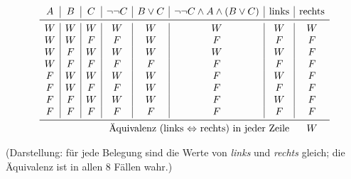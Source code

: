 \documentclass{article}
\begin{document}
\[
    \begin{array}{c|c|c|c|c|c|c|c}
        A                                                                                     & B & C & \neg\neg C & B\lor C & \neg\neg C\land A\land(B\lor C) & \text{links} & \text{rechts} \\
        \midrule
        W                                                                                     & W & W & W          & W       & W                               & W            & W             \\
        W                                                                                     & W & F & F          & W       & F                               & F            & F             \\
        W                                                                                     & F & W & W          & W       & W                               & W            & F             \\
        W                                                                                     & F & F & F          & F       & F                               & F            & F             \\
        F                                                                                     & W & W & W          & W       & F                               & W            & F             \\
        F                                                                                     & W & F & F          & W       & F                               & F            & F             \\
        F                                                                                     & F & W & W          & W       & F                               & W            & F             \\
        F                                                                                     & F & F & F          & F       & F                               & F            & F             \\
        \midrule
        \multicolumn{7}{r}{\text{Äquivalenz (links $\Leftrightarrow$ rechts) in jeder Zeile}} & W                                                                                             \\
    \end{array}
\]

(Darstellung: für jede Belegung sind die Werte von \emph{links} und \emph{rechts} gleich; die Äquivalenz ist in allen 8 Fällen wahr.)
\end{document}
